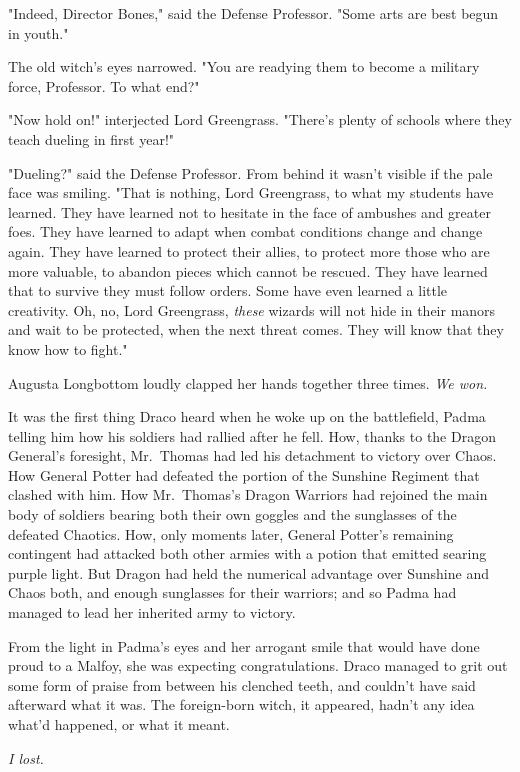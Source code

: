 "Indeed, Director Bones," said the Defense Professor. "Some arts are best begun 
in youth."

The old witch's eyes narrowed. "You are readying them to become a military 
force, Professor. To what end?"

"Now hold on!" interjected Lord Greengrass. "There's plenty of schools where 
they teach dueling in first year!"

"Dueling?" said the Defense Professor. From behind it wasn't visible if the 
pale face was smiling. "That is nothing, Lord Greengrass, to what my students 
have learned. They have learned not to hesitate in the face of ambushes and 
greater foes. They have learned to adapt when combat conditions change and 
change again. They have learned to protect their allies, to protect more those 
who are more valuable, to abandon pieces which cannot be rescued. They have 
learned that to survive they must follow orders. Some have even learned a 
little creativity. Oh, no, Lord Greengrass, \emph{these} wizards will not hide 
in their manors and wait to be protected, when the next threat comes. They will 
know that they know how to fight."

Augusta Longbottom loudly clapped her hands together three times.
\sbreak
\emph{We won.}

It was the first thing Draco heard when he woke up on the battlefield, Padma 
telling him how his soldiers had rallied after he fell. How, thanks to the 
Dragon General's foresight, Mr.~Thomas had led his detachment to victory over 
Chaos. How General Potter had defeated the portion of the Sunshine Regiment 
that clashed with him. How Mr.~Thomas's Dragon Warriors had rejoined the main 
body of soldiers bearing both their own goggles and the sunglasses of the 
defeated Chaotics. How, only moments later, General Potter's remaining 
contingent had attacked both other armies with a potion that emitted searing 
purple light. But Dragon had held the numerical advantage over Sunshine and 
Chaos both, and enough sunglasses for their warriors; and so Padma had managed 
to lead her inherited army to victory.

From the light in Padma's eyes and her arrogant smile that would have done 
proud to a Malfoy, she was expecting congratulations. Draco managed to grit out 
some form of praise from between his clenched teeth, and couldn't have said 
afterward what it was. The foreign-born witch, it appeared, hadn't any idea 
what'd happened, or what it meant.

\emph{I lost.}

